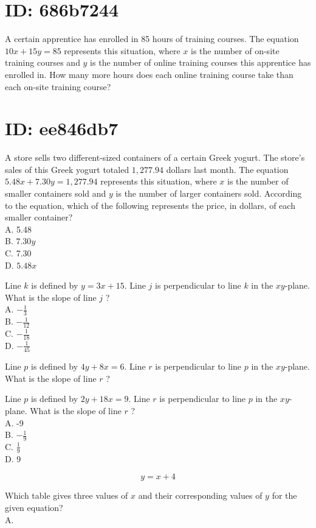 \section*{ID: 686b7244}
A certain apprentice has enrolled in 85 hours of training courses. The equation $10 x+15 y=85$ represents this situation, where $x$ is the number of on-site training courses and $y$ is the number of online training courses this apprentice has enrolled in. How many more hours does each online training course take than each on-site training course?

\section*{ID: ee846db7}
A store sells two different-sized containers of a certain Greek yogurt. The store's sales of this Greek yogurt totaled $1,277.94$ dollars last month. The equation $5.48 x+7.30 y=1,277.94$ represents this situation, where $x$ is the number of smaller containers sold and $y$ is the number of larger containers sold. According to the equation, which of the following represents the price, in dollars, of each smaller container?\\
A. 5.48\\
B. $7.30 y$\\
C. 7.30\\
D. $5.48 x$

Line $k$ is defined by $y=3 x+15$. Line $j$ is perpendicular to line $k$ in the $x y$-plane. What is the slope of line $j$ ?\\
A. $-\frac{1}{3}$\\
B. $-\frac{1}{12}$\\
C. $-\frac{1}{18}$\\
D. $-\frac{1}{45}$

Line $p$ is defined by $4 y+8 x=6$. Line $r$ is perpendicular to line $p$ in the $x y$-plane. What is the slope of line $r$ ?

Line $p$ is defined by $2 y+18 x=9$. Line $r$ is perpendicular to line $p$ in the $x y$-plane. What is the slope of line $r$ ?\\
A. -9\\
B. $-\frac{1}{9}$\\
C. $\frac{1}{9}$\\
D. 9

$$
y=x+4
$$

Which table gives three values of $x$ and their corresponding values of $y$ for the given equation?\\
A.

